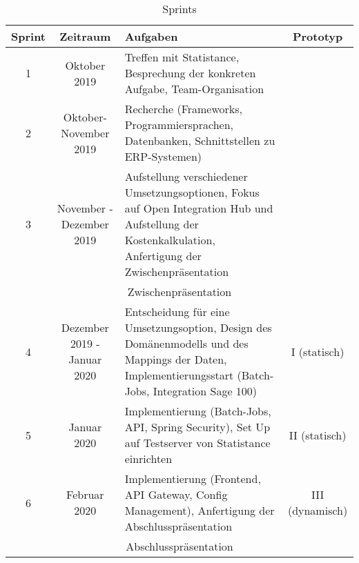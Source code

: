 \begin{table}[h!]
\begin{tabular}{|c|c|p{7cm}|c|}
\hline
\textbf{Sprint} & \textbf{Zeitraum} & \textbf{Aufgaben} &  \textbf{Prototyp}\\ \hline \bottomrule
1 & Oktober 2019  & Treffen mit Statistance, Besprechung der konkreten Aufgabe, Team-Organisation &  \\ \hline
2 & Oktober- November 2019  & Recherche (Frameworks, Programmiersprachen, Datenbanken, Schnittstellen zu ERP-Systemen) &  \\ \hline
3 & November - Dezember 2019 & Aufstellung verschiedener Umsetzungsoptionen, Fokus auf Open Integration Hub und Aufstellung der Kostenkalkulation, Anfertigung der Zwischenpräsentation &  \\ \hline
\multicolumn{4}{|c|}{Zwischenpräsentation}   \\ \hline
4 & Dezember 2019 - Januar 2020 & Entscheidung für eine Umsetzungsoption, Design des Domänenmodells und des Mappings der Daten,  Implementierungsstart (Batch-Jobs, Integration Sage 100) & I (statisch) \\ \hline
5 &  Januar 2020 &  Implementierung (Batch-Jobs, API, Spring Security), Set Up auf Testserver von Statistance einrichten & II (statisch) \\ \hline
6 &  Februar 2020 &   Implementierung (Frontend, API Gateway, Config Management), Anfertigung der Abschlusspräsentation & III (dynamisch)  \\
\hline
\multicolumn{4}{|c|}{Abschlusspräsentation}   \\ \hline
\end{tabular}
\caption{Sprints}
\label{tab:sprints}
\end{table}
\newpage
